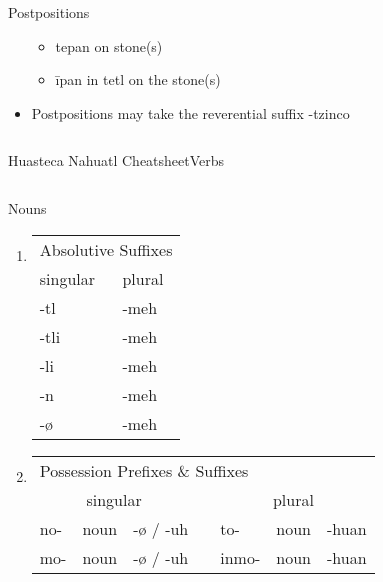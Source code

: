 \documentclass[12pt]{beamer}
\newcommand{\nah}[1]{\textcolor{nahgrn}{#1}}
\newcommand{\trs}[1]{\textcolor{nahblu}{#1}}
\begin{document}
\begin{frame}
\begin{columns}[t]
\begin{column}{.20\linewidth}
\begin{block}{Postpositions}
\begin{itemize}
                \begin{itemize}
                  \item \nah{tepan} \trs{on stone(s)}
                  \item \nah{īpan in tetl} \trs{on the stone(s)}
                \end{itemize}
          \item Postpositions may take the reverential suffix \nah{-tzinco}
        \end{itemize}
      \end{block}
    \end{column}
  \end{columns}
\end{frame}

\begin{frame}%
	{Huasteca Nahuatl Cheatsheet}{Verbs}
	\begin{columns}[t]
		\begin{column}{.23\linewidth}
			\begin{block}{Nouns}
				\begin{enumerate}
					\item \begin{tabular}[t]{ll}
						\multicolumn{2}{l}{Absolutive \trs{Suffixes}} \\
						singular    & plural             \\
						\trs{-tl}   & \trs{-meh}         \\
						\trs{-tli}  & \trs{-meh}         \\
						\trs{-li}   & \trs{-meh}         \\
						\trs{-n}    & \trs{-meh}         \\
						\trs{-ø}    & \trs{-meh}         \\
					\end{tabular}%
					\item \begin{tabular}[t]{lllllll}
						\multicolumn{7}{l}{Possession \nah{Prefixes} \& \trs{Suffixes}}    	   		       \\
						\multicolumn{3}{c}{singular} 			& \vline & \multicolumn{3}{c}{plural}	   \\
						\cline{1-7}
						\nah{no-} & noun & \trs{-ø} / \trs{-uh} & \vline & \nah{to-}   & noun & \trs{-huan}\\
						\nah{mo-} & noun & \trs{-ø} / \trs{-uh} & \vline & \nah{inmo-} & noun & \trs{-huan}\\

\end{tabular}
\end{enumerate}
\end{block}
\end{column}
\end{columns}
\end{frame}
\end{document}
